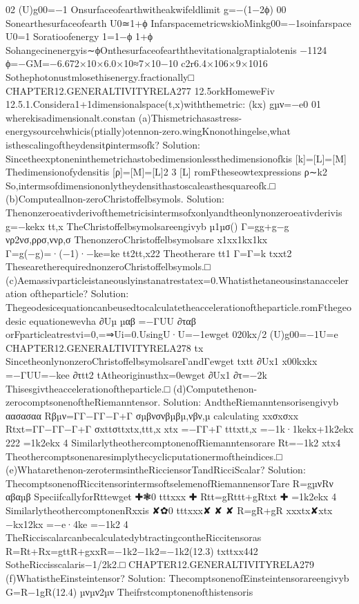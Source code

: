 {{{{{{{{{{{{{{{{02
(U)g00=−1
Onsurfaceofearthwitheakwifeldlimit
g=−(1−2ϕ)
00
Sonearthesurfaceofearth
U0≃1+ϕ
InfarspacemetricwskioMinkg00=−1soinfarspace
U0=1
Soratioofenergy
1=1−ϕ
1+ϕ
Sohangecinenergyis∼ϕOnthesurfaceofearththevitationalgraptialotenis
−1124
ϕ=−GM=−6.672×10×6.0×10≈7×10−10
c2r6.4×106×9×1016
Sothephotonustmlosethisenergy.fractionally□
CHAPTER12.GENERALTIVITYRELA277
12.5orkHomeweFiv
12.5.1.Considera1+1dimensionalspace(t,x)withthemetric:
(kx)
gµν=−e0
01
wherekisadimensionalt.constan
(a)Thismetrichasastress-energysourcehwhicis(ptially)otennon-zero.wingKnonothingelse,what
isthescalingoftheydensitρintermsofk?
Solution:
Sincetheexptoneninthemetrichastobedimensionlessthedimensionofkis
[k]=[L]=[M]
Thedimensionofydensitis
[ρ]=[M]=[L]2
3
[L]
romFtheseowtexpressions
ρ∼k2
So,intermsofdimensiononlytheydensithastoscaleasthesquareofk.□
(b)Computeallnon-zeroChristoffelbsymols.
Solution:
Thenonzeroeativderivofthemetricisintermsofxonlyandtheonlynonzeroeativderivis
g=−kekx
tt,x
TheChristoffelbsymolsareengivyb
µ1µσ()
Γ=gg+g−g
νρ2νσ,ρρσ,ννρ,σ
ThenonzeroChristoffelbsymolsare
x1xx1kx1kx
Γ=g(−g)=·(−1)·−ke=ke
tt2tt,x22
Theotherare
tt1
Γ=Γ=k
txxt2
ThesearetherequirednonzeroChristoffelbsymols.□
(c)Aemassivparticleistaneouslyinstanatrestatex=0.Whatisthetaneousinstanacceleration
oftheparticle?
Solution:
Thegeodesicequationcanbeusedtocalculatetheaccelerationoftheparticle.romFthegeodesic
equationewevha
∂Uµ
µαβ
=−ΓUU
∂ταβ
orFparticleatrestvi=0,=⇒Ui=0.UsingU·U=−1ewget
020kx/2
(U)g00=−1U=e
CHAPTER12.GENERALTIVITYRELA278
tx
SincetheonlynonzeroChristoffelbsymolsareΓandΓewget
txtt
∂Ux1
x00kxkx
=−ΓUU=−kee
∂τtt2
tAtheoriginusthx=0ewget
∂Ux1
∂τ=−2k
Thisesgivtheaccelerationoftheparticle.□
(d)Computethenon-zerocomptsonenoftheRiemanntensor.
Solution:
AndtheRiemanntensorisengivyb
αασασαα
Rβµν=ΓΓ−ΓΓ−Γ+Γ
σµβνσνβµβµ,νβν,µ
calculating
xxσxσxx
Rtxt=ΓΓ−ΓΓ−Γ+Γ
σxttσttxtx,ttt,x
xtx
=−ΓΓ+Γ
tttxtt,x
=−1k·1kekx+1k2ekx
222
=1k2ekx
4
SimilarlytheothercomptonenofRiemanntensorare
Rt=−1k2
xtx4
Theothercomptsonenaresimplythecyclicputationermoftheindices.□
(e)Whatarethenon-zerotermsintheRicciensorTandRicciScalar?
Solution:
ThecomptsonenofRiccitensorintermsoftselemenofRiemannensorTare
R=gµνRν
αβαµβ
SpeciifcallyforRttewget
✚❃0
tttxxx
✚
Rtt=gRttt+gRtxt
✚
=1k2ekx
4
SimilarlytheothercomptonenRxxis
✘✿0
tttxxx✘
✘
✘
R=gR+gR
xxxtx✘xtx
−kx12kx
=−e·4ke
=−1k2
4
TheRicciscalarcanbecalculatedybtractingcontheRiccitensoras
R=Rt+Rx=gttR+gxxR=−1k2−1k2=−1k2(12.3)
txttxx442
SotheRiccisscalaris−1/2k2.□
CHAPTER12.GENERALTIVITYRELA279
(f)WhatistheEinsteintensor?
Solution:
ThecomptsonenofEinsteintensorareengivyb
G=R−1gR(12.4)
µνµν2µν
Theifrstcomptonenofthistensoris
}}}}}}}}}}}}}}}}
